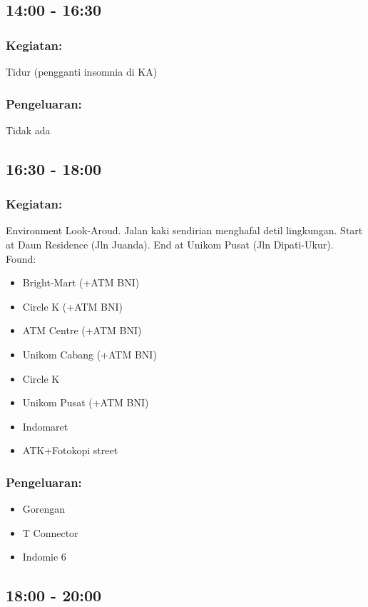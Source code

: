 \documentclass[12pt,]{article}
\begin{document}
	\subsection{14:00 - 16:30}
	\subsubsection{Kegiatan:}
	Tidur (pengganti insomnia di KA)
	
	\subsubsection{Pengeluaran:}
	Tidak ada
	
	\subsection{16:30 - 18:00}
	\subsubsection{Kegiatan:}
	Environment Look-Aroud. Jalan kaki sendirian menghafal detil lingkungan. Start at Daun Residence (Jln Juanda). End at Unikom Pusat (Jln Dipati-Ukur).
	Found:
	\begin{itemize}
		\item Bright-Mart (+ATM BNI)
		\item Circle K (+ATM BNI)
		\item ATM Centre (+ATM BNI)
		\item Unikom Cabang (+ATM BNI)
		\item Circle K
		\item Unikom Pusat (+ATM BNI) 
		\item Indomaret
		\item ATK+Fotokopi street
	\end{itemize}
	
	\subsubsection{Pengeluaran:}
	\begin{itemize}
		\item Gorengan
		\item T Connector
		\item Indomie 6
	\end{itemize}

	\subsection{18:00 - 20:00}
\end{document}
